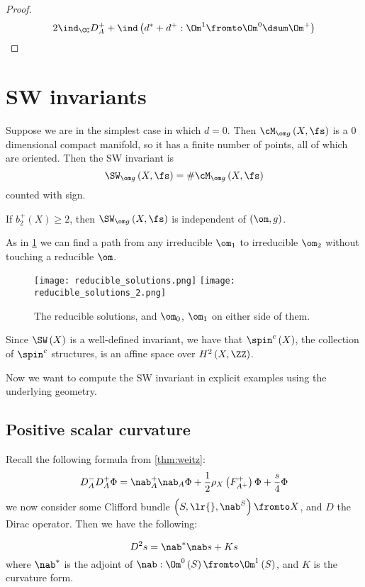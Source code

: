 \documentclass{amsart}
\begin{document}
\begin{proof}
\begin{equation}
2\ind_\CC D_A^+ + \ind \left( d^*+ d^+: \Om^1 \fromto \Om^0\dsum \Om^+ \right)
\end{equation}
\end{proof}


\section{SW invariants}

Suppose we are in the simplest case in which $d = 0$. 
Then $\cM_{\om g}\left( X , \fs \right)$ is a $0$ dimensional compact manifold, 
so it has a finite number of points, all of which are oriented. 
Then the SW invariant is
\begin{equation}
\SW_{\om g}\left( X , \fs \right) = \#\cM_{\om g} \left( X , \fs \right)
\end{equation}
counted with sign.

\begin{fact}
If $b_2^+\left( X \right)\geq 2$, then $\SW_{\om g}\left( X , \fs \right)$
is independent of $\left( \om , g \right)$.
\end{fact}

As in \cref{fig:reducible_solutions} we can find a path from any irreducible $\om_1$ 
to irreducible $\om_2$ without touching a reducible $\om$. 

\begin{figure}
\centering
\texttt{[image: reducible\_solutions.png]}
\texttt{[image: reducible\_solutions\_2.png]}
\caption{The reducible solutions, and $\om_0$, $\om_1$ on either side of them. }
\label{fig:reducible_solutions}
\end{figure}

Since $\SW\left( X \right)$ is a well-defined invariant, 
we have that $\spin^c\left( X \right)$, the collection of $\spin^c$ structures,
is an affine space over $H^2\left( X , \ZZ \right)$.

Now we want to compute the SW invariant in explicit examples using the underlying geometry.

\subsection{Positive scalar curvature}

Recall the following formula from \cref{thm:weitz}:
\begin{equation}
D_A^- D_A^+ \Phi = \nab_A^+ \nab_A \Phi + 
\frac{1}{2} \rho_X\left( F_{A^+}^+ \right) \Phi + \frac{s}{4} \Phi
\end{equation}
we now consider some Clifford bundle $\left( S , \lr{} , \nab^S \right)\fromto X$, 
and $D$ the Dirac operator. Then we have the following:
\begin{fact}
\begin{equation}
D^2 s = \nab^* \nab s + Ks
\end{equation}
where $\nab^*$ is the adjoint of $\nab:\Om^0\left( S \right) \fromto \Om^1\left( S \right)$, and
$K$ is the curvature form.
\end{fact}
\end{document}
